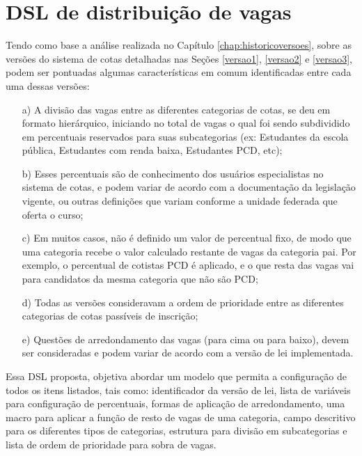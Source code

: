 \section{DSL de distribuição de vagas}
\label{sec:dslproposta:usuario}

   
 Tendo como base a análise realizada no Capítulo \ref{chap:historicoversoes}, sobre as versões do sistema de cotas detalhadas nas Seções \ref{versao1}, \ref{versao2} e \ref{versao3}, podem ser  pontuadas algumas características em comum identificadas entre cada uma dessas versões:
   
   \begin{enumerate}
    \item[a)] A divisão das vagas entre as diferentes categorias de cotas, se deu em formato hierárquico, iniciando no total de vagas o qual foi sendo subdividido em percentuais reservados para suas subcategorias (ex: Estudantes da escola pública, Estudantes com renda baixa, Estudantes PCD, etc); 
   
   \item[b)] Esses percentuais são de conhecimento dos usuários especialistas no sistema de cotas, e podem variar de acordo com a documentação da legislação vigente, ou outras definições que variam conforme a unidade federada que oferta o curso; 
   
   \item[c)] Em muitos casos, não é definido um valor de percentual fixo, de modo que uma categoria recebe o valor calculado restante de vagas da categoria pai. Por exemplo, o percentual de cotistas \gls{PCD} é aplicado, e o que resta das vagas vai para candidatos da mesma categoria que não são \gls{PCD};

   \item[d)] Todas as versões consideravam a ordem de prioridade entre as diferentes categorias de cotas passíveis de inscrição;
   
   \item[e)] Questões de arredondamento das vagas (para cima ou para baixo), devem ser consideradas e podem variar de acordo com a versão de lei implementada.

   \end{enumerate}
   
   Essa \gls{DSL} proposta, objetiva abordar um modelo que permita a configuração de todos os itens listados, tais como: identificador da versão de lei, lista de variáveis para configuração de percentuais, formas de aplicação de arredondamento, uma macro para aplicar a função de resto de vagas de uma categoria, campo descritivo para os diferentes tipos de categorias, estrutura para divisão em subcategorias e lista de ordem de prioridade para sobra de vagas.
   
